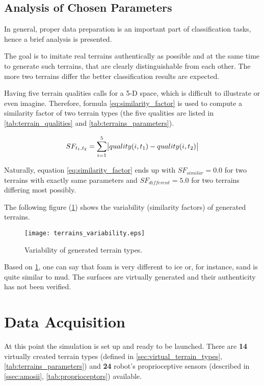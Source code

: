 \subsection{Analysis of Chosen Parameters} \label{ssec:terrains_analysis}
In general, proper data preparation is an important part of classification tasks, hence a brief analysis is presented.

The goal is to imitate real terrains authentically as possible and at the same time to generate such terrains, that are clearly distinguishable from each other. The more two terrains differ the better classification results are expected.

Having five terrain qualities calls for a 5-D space, which is difficult to illustrate or even imagine. Therefore, formula \ref{eq:similarity_factor} is used to compute a similarity factor of two terrain types (the five qualities are listed in \cref{tab:terrain_qualities} and \cref{tab:terrains_parameters}).


\begin{equation} 
\label{eq:similarity_factor}
  SF_{t_1, t_2} = \displaystyle\sum_{i=1}^{5} \abs{quality(i, t_1) - quality(i, t_2)}
\end{equation} 

Naturally, equation \ref{eq:similarity_factor} ends up with $ SF_{similar} = 0.0 $ for two terrains with exactly same parameters and $ SF_{different} = 5.0 $ for two terrains differing most possibly.

The following figure (\ref{fig:terrains_parameters}) shows the variability (similarity factors) of generated terrains.

\begin{figure}[H]
  \centering
  \texttt{[image: terrains\_variability.eps]}
  \caption{Variability of generated terrain types.}
  \label{fig:terrains_parameters}
\end{figure}

Based on \cref{fig:terrains_parameters}, one can say that foam is very different to ice or, for instance, sand is quite similar to mud. The surfaces are virtually generated and their authenticity has not been verified. 

\section{Data Acquisition} \label{sec:data_acquisition}
At this point the simulation is set up and ready to be launched. There are \textbf{14} virtually created terrain types (defined in \cref{sec:virtual_terrain_types}, \cref{tab:terrains_parameters}) and \textbf{24} robot's proprioceptive sensors (described in \cref{ssec:amosii}, \cref{tab:proprioceptors}) available.

